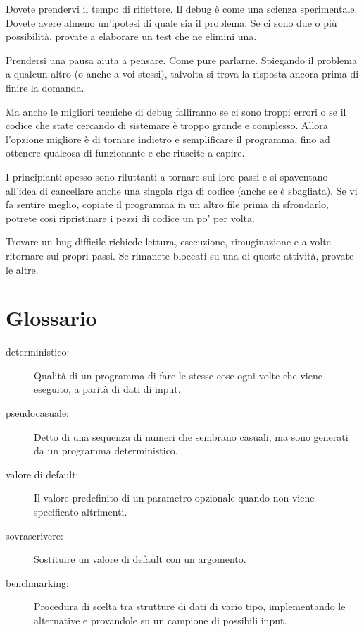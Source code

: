 \documentclass[10pt]{book}
\begin{document}
Dovete prendervi il tempo di riflettere. Il debug è come una scienza sperimentale. Dovete avere almeno un'ipotesi di quale sia il problema. Se ci sono due o più possibilità, provate a elaborare un test che ne elimini una.

Prendersi una pausa aiuta a pensare. Come pure parlarne. Spiegando il problema a qualcun altro (o anche a voi stessi), talvolta si trova la risposta ancora prima di finire la domanda.

Ma anche le migliori tecniche di debug falliranno se ci sono troppi errori o se il codice che state cercando di sistemare è troppo grande e complesso. Allora l'opzione migliore è di tornare indietro e semplificare il programma, fino ad ottenere qualcosa di funzionante e che riuscite a capire.

I principianti spesso sono riluttanti a tornare sui loro passi e si spaventano all'idea di cancellare anche una singola riga di codice (anche se è sbagliata). Se vi fa sentire meglio, copiate il programma in un altro file prima di sfrondarlo, potrete così ripristinare i pezzi di codice un po' per volta.

Trovare un bug difficile richiede lettura, esecuzione, rimuginazione e a volte ritornare sui propri passi. Se rimanete bloccati su una di queste attività, provate le altre.


\section{Glossario}

\begin{description}

\item[deterministico:] Qualità di un programma di fare le stesse cose ogni volte che viene eseguito, a parità di dati di input.

\item[pseudocasuale:] Detto di una sequenza di numeri che sembrano casuali, ma sono generati da un programma deterministico.

\item[valore di default:] Il valore predefinito di un parametro opzionale quando non viene specificato altrimenti.

\item[sovrascrivere:] Sostituire un valore di default con un argomento.

\item[benchmarking:] Procedura di scelta tra strutture di dati di vario tipo, implementando le alternative e provandole su un campione di possibili input.

\end{description}
\end{document}
